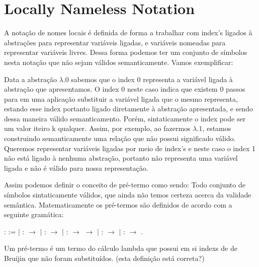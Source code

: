 
\begin{coqdoccode}
\coqdocemptyline
\end{coqdoccode}
\section{Locally Nameless Notation}

\begin{coqdoccode}
\coqdocemptyline
\coqdocemptyline
\end{coqdoccode}
A notação de nomes locais é definida de forma a trabalhar com index's ligados à abstrações
para representar variáveis ligadas, e variáveis nomeadas para representar variáveis livres. Dessa
forma podemos ter um conjunto de símbolos nesta notação que não sejam válidos semanticamente. 
Vamos exemplificar: 


Data a abstração $\lambda.0$ sabemos que o index 0 representa a variável ligada à abstração
que apresentamos. O index 0 neste caso indica que existem 0 passos para em uma aplicação
substituir a variável ligada que o mesmo representa, estando esse index portanto ligado
diretamente à abstração apresentada, e sendo dessa maneira válido semanticamento. Porém,
sintaticamente o index pode ser um valor iteiro k qualquer. Assim, por exemplo, ao 
fazermos $\lambda.1$, estamos construindo semanticamente uma relação que não possui 
significado válido. Queremos representar variáveis ligadas por meio de index's e neste caso o 
index 1 não está ligado à nenhuma abstração, portanto não representa uma variável ligada
e não é válido para nossa representação.

 Assim podemos definir o conceito de pré-termo como sendo: Todo conjunto de símbolos sintaticamente
válidos, que ainda não temos certeza acerca da validade semântica. Matematicamente os pré-termos 
são definidos de acordo com a seguinte gramática: \begin{coqdoccode}
\coqdocemptyline
\coqdocnoindent
{}  :  :=\coqdoceol
\coqdocindent{1.00em}
\ensuremath{|}  :  \ensuremath{\rightarrow} \coqdoceol
\coqdocindent{1.00em}
\ensuremath{|}  :  \ensuremath{\rightarrow} \coqdoceol
\coqdocindent{1.00em}
\ensuremath{|}   :  \ensuremath{\rightarrow}  \ensuremath{\rightarrow} \coqdoceol
\coqdocindent{1.00em}
\ensuremath{|}   :  \ensuremath{\rightarrow} \coqdoceol
\coqdocindent{1.00em}
\ensuremath{|}   :  \ensuremath{\rightarrow} .\coqdoceol
\coqdocemptyline
\end{coqdoccode}
Um pré-termo é um termo do cálculo lambda que possui em si indexs de de Bruijin que não foram
substituídos. (esta definição está correta?)


